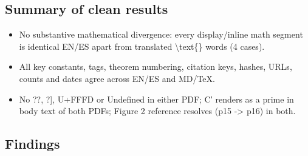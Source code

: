\documentclass[
]{article}
\providecommand{\tightlist}{%
  \setlength{\itemsep}{0pt}\setlength{\parskip}{0pt}}
\begin{document}
\subsection{Summary of clean results}\label{summary-of-clean-results}

\begin{itemize}
\tightlist
\item
  No substantive mathematical divergence: every display/inline math
  segment is identical EN/ES apart from translated
  \textbackslash text\{\} words (4 cases).
\item
  All key constants, tags, theorem numbering, citation keys, hashes,
  URLs, counts and dates agree across EN/ES and MD/TeX.
\item
  No \textquotesingle??\textquotesingle,
  \textquotesingle{[}?{]}\textquotesingle, U+FFFD or
  \textquotesingle Undefined\textquotesingle{} in either PDF; C′ renders
  as a prime in body text of both PDFs; Figure 2 reference resolves (p15
  -\textgreater{} p16) in both.
\end{itemize}

\subsection{Findings}\label{findings}
\end{document}
